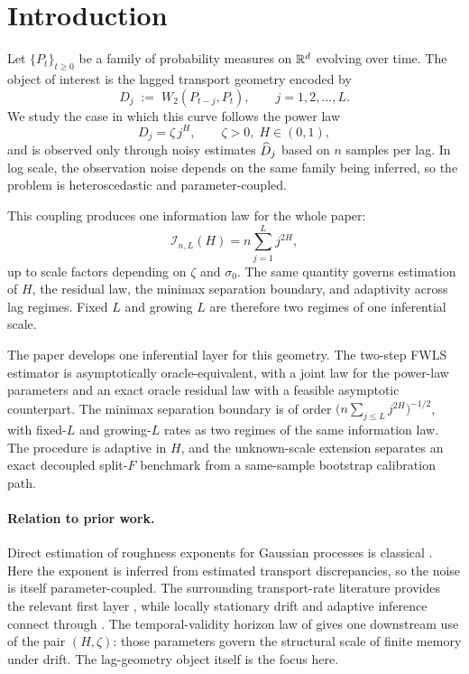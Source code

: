\section{Introduction}
\label{sec:intro}

Let $\{P_t\}_{t \geq 0}$ be a family of probability measures on $\mathbb{R}^d$
evolving over time. The object of interest is the lagged transport geometry
encoded by
\[
    D_j \;:=\; W_2(P_{t-j}, P_t),\qquad j = 1, 2, \ldots, L.
\]
We study the case in which this curve follows the power law
\begin{equation}
    D_j = \zeta\,j^H,\qquad \zeta > 0,\; H \in (0,1),
    \label{eq:power-law}
\end{equation}
and is observed only through noisy estimates $\widehat{D}_j$ based on $n$ samples per
lag. In log scale, the observation noise depends on the same family being
inferred, so the problem is heteroscedastic and parameter-coupled.

This coupling produces one information law for the whole paper:
\[
    \mathcal I_{n,L}(H) = n \sum_{j=1}^L j^{2H},
\]
up to scale factors depending on $\zeta$ and $\sigma_0$. The same quantity
governs estimation of $H$, the residual law, the minimax separation
boundary, and adaptivity across lag regimes. Fixed $L$ and growing $L$ are
therefore two regimes of one inferential scale.

The paper develops one inferential layer for this geometry. The two-step FWLS
estimator is asymptotically oracle-equivalent, with a joint law for the
power-law parameters and an exact oracle residual law with a feasible asymptotic
counterpart. The minimax separation boundary is of order
$\bigl(n\sum_{j \leq L} j^{2H}\bigr)^{-1/2}$, with fixed-$L$ and growing-$L$
rates as two regimes of the same information law. The procedure is adaptive in
$H$, and the unknown-scale extension separates an exact decoupled split-$F$
benchmark from a same-sample bootstrap calibration path.

\paragraph{Relation to prior work.}
Direct estimation of roughness exponents for Gaussian processes is classical
\citep{istas1997quadratic,coeurjolly2001estimating}. Here the exponent is
inferred from estimated transport discrepancies, so the noise is itself
parameter-coupled. The surrounding transport-rate literature
provides the relevant first layer \citep{fournier2015rate,weed2019sharp,
goldfeld2024limit,delbarrio2023improved}, while locally stationary drift and
adaptive inference connect through \citep{dahlhaus1997fitting,
vogt2012nonparametric,tinio2025bounds,brutsche2024similarity}.
The temporal-validity horizon law of \citet{Parreira2026May} gives one
downstream use of the pair $(H,\zeta)$: those parameters govern the structural
scale of finite memory under drift. The lag-geometry object itself is the focus
here.

